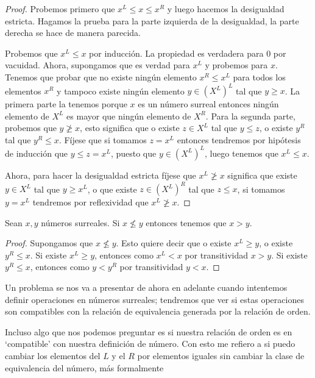     \begin{proof}
        Probemos primero que $x^L \le x \le x^R$ y luego hacemos la desigualdad estricta. Hagamos la prueba para la parte izquierda de la desigualdad, la parte derecha se hace de manera parecida.

        Probemos que $x^L \le x$ por inducci\'on. La propiedad es verdadera para $0$ por vacuidad. Ahora, supongamos que es verdad para $x^L$ y probemos para $x$. Tenemos que probar que no existe ning\'un elemento $x^R \le x^L$ para todos los elementos $x^R$ y tampoco existe ningún elemento $y\in (X^L)^L$ tal que $y \ge x$. La primera parte la tenemos porque $x$ es un n\'umero surreal entonces ning\'un elemento de $X^L$ es mayor que ning\'un elemento de $X^R$. Para la segunda parte, probemos que $y \not\ge x$, esto significa que o existe $z\in X^L$ tal que $y\le z$, o existe $y^R$ tal que $y^R\le x$. F\'ijese que si tomamos $z = x^L$ entonces tendremos por hip\'otesis de inducci\'on que $y\le z = x^L$, puesto que $y\in (X^L)^L$, luego tenemos que $x^L\le x$.

        Ahora, para hacer la desigualdad estricta f\'ijese que $x^L \not\ge x$ significa que existe $y\in X^L$ tal que $y\ge x^L$, o que existe $z\in (X^L)^R$ tal que $z\le x$, si tomamos $y=x^L$ tendremos por reflexividad que $x^L\not\ge x$.
    \end{proof}

    \begin{corollary}[Linealidad]
        Sean $x, y$ n\'umeros surreales. Si $x \not\le y$ entonces tenemos que $x > y$. 
    \end{corollary}

    \begin{proof}
        Supongamos que $x\not\le y$. Esto quiere decir que o existe $x^L \ge y$, o existe $y^R \le x$. Si existe $x^L \ge y$, entonces como $x^L < x$ por transitividad $x > y$. Si existe $y^R \le x$, entonces como $y < y^R$ por transitividad $y < x$.
    \end{proof}

    Un problema se nos va a presentar de ahora en adelante cuando intentemos definir operaciones en n\'umeros surreales; tendremos que ver si estas operaciones son compatibles con la relaci\'on de equivalencia generada por la relaci\'on de orden.

    Incluso algo que nos podemos preguntar es si nuestra relaci\'on de orden es en `compatible' con nuestra definici\'on de n\'umero. Con esto me refiero a si puedo cambiar los elementos del $L$ y el $R$ por elementos iguales sin cambiar la clase de equivalencia del n\'umero, m\'as formalmente

